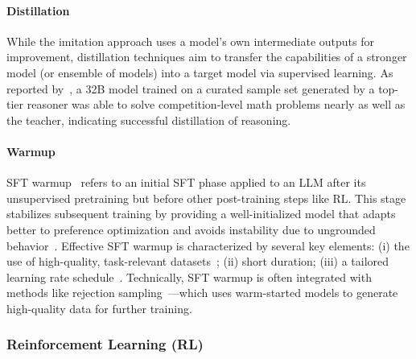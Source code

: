 \paragraph{Distillation}
While the imitation approach uses a model’s own intermediate outputs for improvement, distillation techniques aim to transfer the capabilities of a stronger model (or ensemble of models) into a target model via supervised learning. As reported by~\citet{muennighoff2025s1,li2025llmseasilylearnreason}, a 32B model trained on a curated sample set generated by a top-tier reasoner was able to solve competition-level math problems nearly as well as the teacher, indicating successful distillation of reasoning.

\paragraph{Warmup}
SFT warmup~\citep{luong2024reftreasoningreinforcedfinetuning} refers to an initial SFT phase applied to an LLM after its unsupervised pretraining but before other post-training steps like RL. This stage stabilizes subsequent training by providing a well-initialized model that adapts better to preference optimization and avoids instability due to ungrounded behavior~\citep{zeng2025itoolboostingtooluse}. Effective SFT warmup is characterized by several key elements: (i) the use of high-quality, task-relevant datasets~\citep{luong2024reftreasoningreinforcedfinetuning}; (ii) short duration; (iii) a tailored learning rate schedule~\citep{pareja2024unveilingsecretrecipeguide}. Technically, SFT warmup is often integrated with methods like rejection sampling~\citep{pareja2024unveilingsecretrecipeguide}—which uses warm-started models to generate high-quality data for further training.

\subsubsection{Reinforcement Learning (RL)}
\label{subsubsec:rl}

